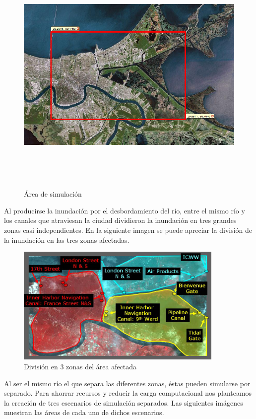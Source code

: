 \begin{figure}[H]
 \centering
 \includegraphics[height=120mm,angle=90]{figuras/cap6/NOarea1.png}
 \caption{Área de simulación}
\end{figure}

Al producirse la inundación por el desbordamiento del río, entre el mismo río y
los canales que atraviesan la ciudad dividieron la inundación en tres grandes
zonas casi independientes\cite{Pennington06}. En la siguiente imagen se puede
apreciar la división de la inundación en las tres zonas afectadas.

\begin{figure}[H]
 \centering
 \includegraphics[width=100mm]{figuras/cap6/affected.png}
 \caption{División en 3 zonas del área afectada}
\end{figure}

Al ser el mismo río el que separa las diferentes zonas, éstas pueden simularse
por separado. Para ahorrar recursos y reducir la carga computacional nos
planteamos la creación de tres escenarios de simulación separados. Las
siguientes imágenes muestran las áreas de cada uno de dichos escenarios.

